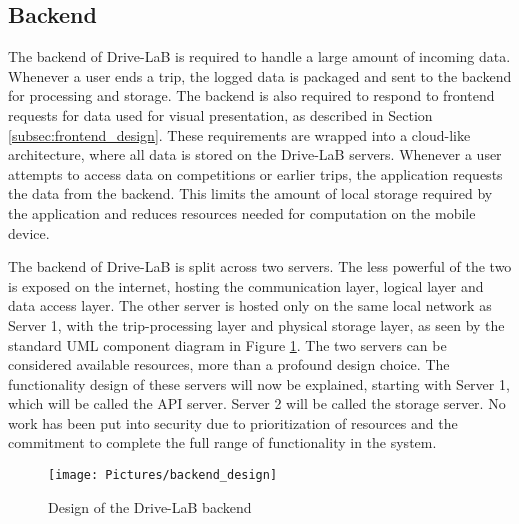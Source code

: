 \subsection{Backend}\label{subsec:backend_design}
The backend of Drive-LaB is required to handle a large amount of incoming data. Whenever a user ends a trip, the logged data is packaged and sent to the backend for processing and storage. The backend is also required to respond to frontend requests for data used for visual presentation, as described in Section \ref{subsec:frontend_design}. These requirements are wrapped into a cloud-like architecture, where all data is stored on the Drive-LaB servers. Whenever a user attempts to access data on competitions or earlier trips, the application requests the data from the backend. This limits the amount of local storage required by the application and reduces resources needed for computation on the mobile device.

The backend of Drive-LaB is split across two servers. The less powerful of the two is exposed on the internet, hosting the communication layer, logical layer and data access layer. The other server is hosted only on the same local network as Server 1, with the trip-processing layer and physical storage layer, as seen by the standard UML component diagram in Figure \ref{fig:backend_design}. The two servers can be considered available resources, more than a profound design choice. The functionality design of these servers will now be explained, starting with Server 1, which will be called the API server. Server 2 will be called the storage server. No work has been put into security due to prioritization of resources and the commitment to complete the full range of functionality in the system.

\begin{figure}[tb]
\centering
\texttt{[image: Pictures/backend\_design]}
\caption{Design of the Drive-LaB backend}
\label{fig:backend_design}
\end{figure}